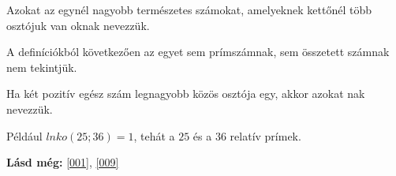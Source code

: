 \begin{defin}
Azokat az egynél nagyobb természetes számokat, amelyeknek kettőnél több
osztójuk van oknak nevezzük.
\end{defin}

\begin{corollary}
A definíciókból következően az egyet sem prímszámnak, sem összetett számnak nem
tekintjük.
\end{corollary}

\begin{defin}
Ha két pozitív egész szám legnagyobb közös osztója egy, akkor azokat
nak nevezzük.

Például $lnko(25; 36) = 1$, tehát a $25$ és a $36$ relatív prímek.
\end{defin}

\textbf{Lásd még:} \ref{001}, \ref{009}
